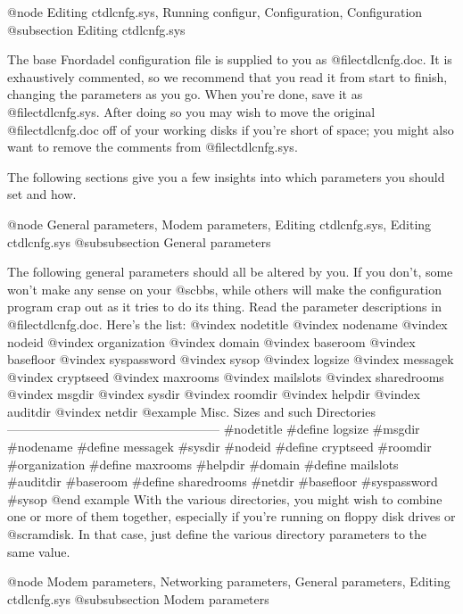 @node Editing ctdlcnfg.sys, Running configur, Configuration, Configuration
@subsection Editing ctdlcnfg.sys

The base Fnordadel configuration file is supplied to you as
@file{ctdlcnfg.doc}.  It is exhaustively commented, so we recommend that you
read it from start to finish, changing the parameters as you go.  When you're
done, save it as @file{ctdlcnfg.sys}.  After doing so you may wish
to move the original @file{ctdlcnfg.doc} off of your working disks if you're
short of space; you might also want to remove the comments from @file{ctdlcnfg.sys}.

The following sections give you a few insights into which parameters you
should set and how.

@node General parameters, Modem parameters, Editing ctdlcnfg.sys, Editing ctdlcnfg.sys
@subsubsection General parameters

The following general parameters should all be altered
by you.  If you don't, some won't make any sense on your @sc{bbs},
while others will make the configuration program crap out as
it tries to do its thing.  Read the parameter descriptions in
@file{ctdlcnfg.doc}.  Here's the list:
@vindex nodetitle
@vindex nodename
@vindex nodeid
@vindex organization
@vindex domain
@vindex baseroom
@vindex basefloor
@vindex syspassword
@vindex sysop
@vindex logsize
@vindex messagek
@vindex cryptseed
@vindex maxrooms
@vindex mailslots
@vindex sharedrooms
@vindex msgdir
@vindex sysdir
@vindex roomdir
@vindex helpdir
@vindex auditdir
@vindex netdir
@example
Misc.           Sizes and such          Directories
---------------------------------------------------
#nodetitle      #define logsize         #msgdir
#nodename       #define messagek        #sysdir
#nodeid         #define cryptseed       #roomdir
#organization   #define maxrooms        #helpdir
#domain         #define mailslots       #auditdir
#baseroom       #define sharedrooms     #netdir
#basefloor
#syspassword
#sysop
@end example
With the various directories, you might wish to combine
one or more of them together, especially if you're running on
floppy disk drives or @sc{ram}disk.  In that case, just define the
various directory parameters to the same value.

@node Modem parameters, Networking parameters, General parameters, Editing ctdlcnfg.sys
@subsubsection Modem parameters

